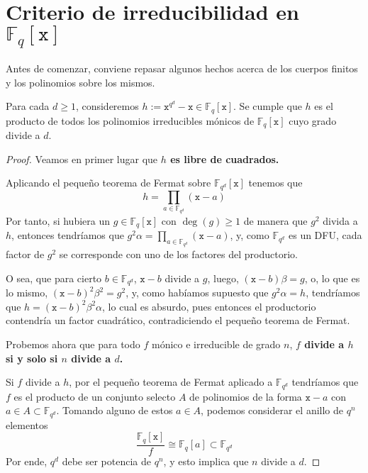 \documentclass[a4paper, 11pt, twoside, notitlepage, openany, onecolumn, final]{report}
\begin{document}
	\section{Criterio de irreducibilidad en $\mathbb{F}_q[\texttt{x}]$}
	Antes de comenzar, conviene repasar algunos hechos acerca de los cuerpos finitos y los polinomios sobre los mismos.
	\begin{theo}
		Para cada $d\geq 1$, consideremos $h:=\texttt{x}^{q^d}-\texttt{x}\in\mathbb{F}_q[\texttt{x}]$. Se cumple que $h$ es el producto de todos los polinomios irreducibles mónicos de $\mathbb{F}_q[\texttt{x}]$ cuyo grado divide a $d$.
	\end{theo}
	\begin{proof}
		Veamos en primer lugar que \textbf{$h$ es libre de cuadrados.}
		
		Aplicando el pequeño teorema de Fermat sobre $\mathbb{F}_{q^d}[\texttt{x}]$ tenemos que
		\begin{equation*}
			h=\prod_{a\in\mathbb{F}_{q^d}}(\texttt{x}-a)
		\end{equation*}
		Por tanto, si hubiera un $g\in \mathbb{F}_q[\texttt{x}]$ con $\deg(g)\geq 1$ de manera que $g^2$ divida a $h$, entonces tendríamos que $g^2\alpha=\prod_{a\in\mathbb{F}_{q^d}}(\texttt{x}-a)$, y, como $\mathbb{F}_{q^d}$ es un DFU, cada factor de $g^2$ se corresponde con uno de los factores del productorio.
	
		O sea, que para cierto $b\in \mathbb{F}_{q^d}$, $\texttt{x}-b$ divide a $g$, luego, $(\texttt{x}-b)\beta = g$, o, lo que es lo mismo, $(\texttt{x}-b)^2\beta^2 = g^2$, y, como habíamos supuesto que $g^2\alpha = h$, tendríamos que $h=(\texttt{x}-b)^2\beta^2\alpha$, lo cual es absurdo, pues entonces el productorio contendría un factor cuadrático, contradiciendo el pequeño teorema de Fermat.
	
		Probemos ahora que para todo $f$ mónico e irreducible de grado $n$, \textbf{$f$ divide a $h$ si y solo si $n$ divide a $d$.}
		
		Si $f$ divide a $h$, por el pequeño teorema de Fermat aplicado a $\mathbb{F}_{q^d}$ tendríamos que $f$ es el producto de un conjunto selecto $A$ de polinomios de la forma $\texttt{x}-a$ con $a\in A\subset \mathbb{F}_{q^d}$. Tomando alguno de estos $a\in A$, podemos considerar el anillo de $q^n$ elementos
		\begin{equation*}
			\frac{\mathbb{F}_q[\texttt{x}]}{f}\cong \mathbb{F}_q[a]\subset \mathbb{F}_{q^d}
		\end{equation*}
	Por ende, $q^d$ debe ser potencia de $q^n$, y esto implica que $n$ divide a $d$.
	

\end{proof}
\end{document}
